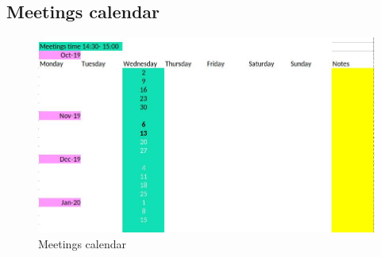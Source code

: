 \documentclass{scrartcl}
\begin{document}
\subsection{Meetings calendar}

\begin{figure}[H]
\centering
\includegraphics[width = 130mm]{agenda.jpg}
\caption{Meetings calendar}
\label{calendar}
\end{figure}
\end{document}
